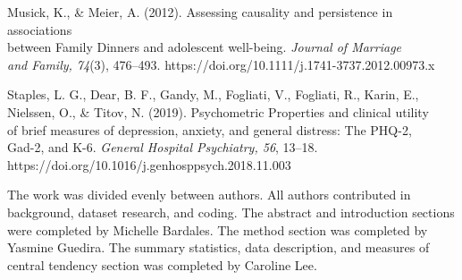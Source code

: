 \documentclass[12pt,letterpaper]{article}
\begin{document}
\noindent Musick, K., \& Meier, A. (2012). Assessing causality and persistence in associations \\
\indent between Family Dinners and adolescent well-being. \textit{Journal of Marriage} \\ 
\indent \textit{and Family, 74}(3), 476–493. https://doi.org/10.1111/j.1741-3737.2012.00973.x

\noindent Staples, L. G., Dear, B. F., Gandy, M., Fogliati, V., Fogliati, R., Karin, E., \\
\indent Nielssen, O., \& Titov, N. (2019). Psychometric Properties and clinical utility \\ 
\indent of brief measures of depression, anxiety, and general distress: The PHQ-2, \\ 
\indent Gad-2, and K-6. \textit{General Hospital Psychiatry, 56}, 13–18. \\ 
\indent https://doi.org/10.1016/j.genhosppsych.2018.11.003 


\pagebreak
\begin{center}
\end{center}

  
\pagebreak 

\pagebreak

  

\begin{center}
\end{center}

  


  

\begin{center}
\end{center}

  


  

\begin{center}
\end{center}

The work was divided evenly between authors. All authors contributed in background, dataset research, and coding. The abstract and introduction sections were completed by Michelle Bardales. The method section was completed by Yasmine Guedira. The summary statistics, data description, and measures of central tendency section was completed by Caroline Lee.  

\pagebreak
\let\clearpage\relax
\end{document}
